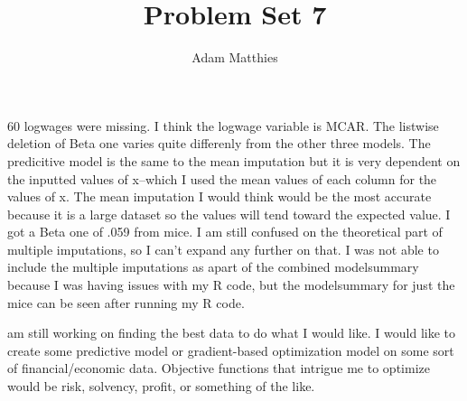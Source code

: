 \documentclass[12pt]{article}
\newenvironment{statement}[2][Statement]{\begin{trivlist}
\item[\hskip \labelsep {\bfseries #1}\hskip \labelsep {\bfseries #2.}]}{\end{trivlist}}
\begin{document}
 
%
%
 
\title{Problem Set 7} %
\author{Adam Matthies} %
\maketitle


\begin{statement}

560 logwages were missing. I think the logwage variable is MCAR. The listwise deletion of Beta one
varies quite differenly from the other three models. The predicitive model is the same to the mean
imputation but it is very dependent on the inputted values of x--which I used the mean values of
each column for the values of x. The mean imputation I would think would be the most accurate
because it is a large dataset so the values will tend toward the expected value. I got a Beta one
of .059 from mice. I am still confused on the theoretical part of multiple imputations, so I can't
expand any further on that. I was not able to include the multiple imputations as apart of the
combined modelsummary because I was having issues with my R code, but the modelsummary for just
the mice can be seen after running my R code.

\end{statement}

\begin{statement}

I am still working on finding the best data to do what I would like. I would like to create
some predictive model or gradient-based optimization model on some sort of financial/economic
data. Objective functions that intrigue me to optimize would be risk, solvency, profit, or something of the like.
\end{statement}
 
\end{document}
